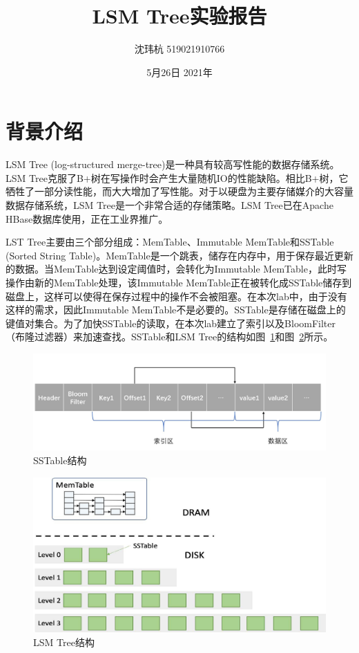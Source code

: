 \documentclass[fontset=windows]{article}
\title{LSM Tree实验报告}
\author{沈玮杭 519021910766 }
\date{5月26日 2021年}
\begin{document}
\maketitle

\section{背景介绍}
LSM Tree (log-structured merge-tree)是一种具有较高写性能的数据存储系统。LSM Tree克服了B+树在写操作时会产生大量随机IO的性能缺陷。相比B+树，它牺牲了一部分读性能，而大大增加了写性能。对于以硬盘为主要存储媒介的大容量数据存储系统，LSM Tree是一个非常合适的存储策略。LSM Tree已在Apache HBase数据库使用，正在工业界推广。

LST Tree主要由三个部分组成：MemTable、Immutable MemTable和SSTable (Sorted String Table)。MemTable是一个跳表，储存在内存中，用于保存最近更新的数据。当MemTable达到设定阈值时，会转化为Immutable MemTable，此时写操作由新的MemTable处理，该Immutable MemTable正在被转化成SSTable储存到磁盘上，这样可以使得在保存过程中的操作不会被阻塞。在本次lab中，由于没有这样的需求，因此Immutable MemTable不是必要的。SSTable是存储在磁盘上的键值对集合。为了加快SSTable的读取，在本次lab建立了索引以及BloomFilter（布隆过滤器）来加速查找。SSTable和LSM Tree的结构如图~\ref{fig:sstable}和图~\ref{fig:lsm}所示。

\begin{figure}[h!]
\centering
\includegraphics[scale=0.8]{sstable}
\caption{SSTable结构}
\label{fig:sstable}
\end{figure}

\begin{figure}[h!]
\centering
\includegraphics[scale=1]{lsm}
\caption{LSM Tree结构}
\label{fig:lsm}
\end{figure}
\end{document}
